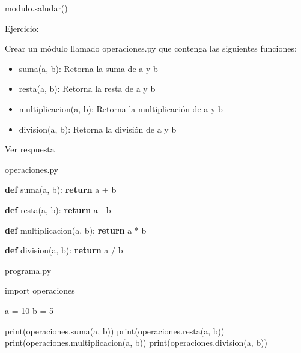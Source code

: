 \documentclass[
  a4paper,
  DIV=11,
  numbers=noendperiod,
  onepage,
  openany]{scrreprt}
\newenvironment{Shaded}{\begin{snugshade}}{\end{snugshade}}
\newcommand{\BuiltInTok}[1]{\textcolor[rgb]{0.00,0.23,0.31}{#1}}
\newcommand{\ControlFlowTok}[1]{\textcolor[rgb]{0.00,0.23,0.31}{\textbf{#1}}}
\newcommand{\DecValTok}[1]{\textcolor[rgb]{0.68,0.00,0.00}{#1}}
\newcommand{\ImportTok}[1]{\textcolor[rgb]{0.00,0.46,0.62}{#1}}
\newcommand{\KeywordTok}[1]{\textcolor[rgb]{0.00,0.23,0.31}{\textbf{#1}}}
\newcommand{\NormalTok}[1]{\textcolor[rgb]{0.00,0.23,0.31}{#1}}
\newcommand{\OperatorTok}[1]{\textcolor[rgb]{0.37,0.37,0.37}{#1}}
\providecommand{\tightlist}{%
  \setlength{\itemsep}{0pt}\setlength{\parskip}{0pt}}\usepackage{longtable,booktabs,array}
\begin{document}
\begin{tcolorbox}
\begin{Shaded}
\begin{Highlighting}[]
\NormalTok{modulo.saludar()}
\end{Highlighting}
\end{Shaded}

Ejercicio:

Crear un módulo llamado operaciones.py que contenga las siguientes
funciones:

\begin{itemize}
\tightlist
\item
  suma(a, b): Retorna la suma de a y b
\item
  resta(a, b): Retorna la resta de a y b
\item
  multiplicacion(a, b): Retorna la multiplicación de a y b
\item
  division(a, b): Retorna la división de a y b
\end{itemize}

Ver respuesta

operaciones.py

\begin{Shaded}
\begin{Highlighting}[]
\KeywordTok{def}\NormalTok{ suma(a, b):}
    \ControlFlowTok{return}\NormalTok{ a }\OperatorTok{+}\NormalTok{ b}

\KeywordTok{def}\NormalTok{ resta(a, b):}
    \ControlFlowTok{return}\NormalTok{ a }\OperatorTok{{-}}\NormalTok{ b}

\KeywordTok{def}\NormalTok{ multiplicacion(a, b):}
    \ControlFlowTok{return}\NormalTok{ a }\OperatorTok{*}\NormalTok{ b}

\KeywordTok{def}\NormalTok{ division(a, b):}
    \ControlFlowTok{return}\NormalTok{ a }\OperatorTok{/}\NormalTok{ b}
\end{Highlighting}
\end{Shaded}

programa.py

\begin{Shaded}
\begin{Highlighting}[]

\ImportTok{import}\NormalTok{ operaciones}

\NormalTok{a }\OperatorTok{=} \DecValTok{10}
\NormalTok{b }\OperatorTok{=} \DecValTok{5}

\BuiltInTok{print}\NormalTok{(operaciones.suma(a, b))}
\BuiltInTok{print}\NormalTok{(operaciones.resta(a, b))}
\BuiltInTok{print}\NormalTok{(operaciones.multiplicacion(a, b))}
\BuiltInTok{print}\NormalTok{(operaciones.division(a, b))}
\end{Highlighting}
\end{Shaded}


\end{tcolorbox}
\end{document}
